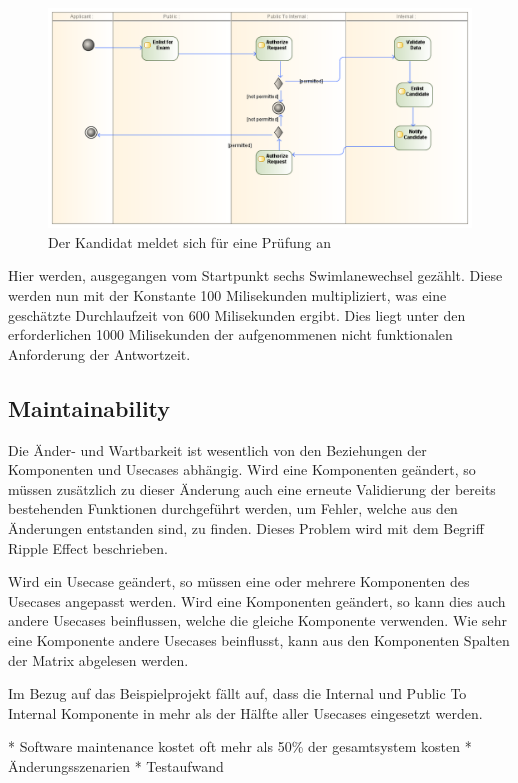 \begin{figure}[H]
    \centering
    \includegraphics[scale=0.4]{uml/applycomplicated.png}
    \caption{Der Kandidat meldet sich für eine Prüfung an}
    \label{fig:applycomplicated}
\end{figure}

Hier werden, ausgegangen vom Startpunkt sechs Swimlanewechsel gezählt. Diese werden nun mit der Konstante 100 Milisekunden multipliziert, was eine geschätzte Durchlaufzeit von 600 Milisekunden ergibt. Dies liegt unter den erforderlichen 1000 Milisekunden der aufgenommenen nicht funktionalen Anforderung der Antwortzeit.

\subsection{Maintainability}
Die Änder- und Wartbarkeit ist wesentlich von den Beziehungen der Komponenten und Usecases abhängig. Wird eine Komponenten geändert, so müssen zusätzlich zu dieser Änderung auch eine erneute Validierung der bereits bestehenden Funktionen durchgeführt werden, um Fehler, welche aus den Änderungen entstanden sind, zu finden. Dieses Problem wird mit dem Begriff Ripple Effect beschrieben. \cite[S. 3]{ripple}

Wird ein Usecase geändert, so müssen eine oder mehrere Komponenten des Usecases angepasst werden. Wird eine Komponenten geändert, so kann dies auch andere Usecases beinflussen, welche die gleiche Komponente verwenden. Wie sehr eine Komponente andere Usecases beinflusst, kann aus den Komponenten Spalten der Matrix abgelesen werden.

Im Bezug auf das Beispielprojekt fällt auf, dass die Internal und Public To Internal Komponente in mehr als der Hälfte aller Usecases eingesetzt werden.

* Software maintenance kostet oft mehr als 50\% der gesamtsystem kosten \cite[S. 71-84]{maincost}
* Änderungsszenarien
* Testaufwand

